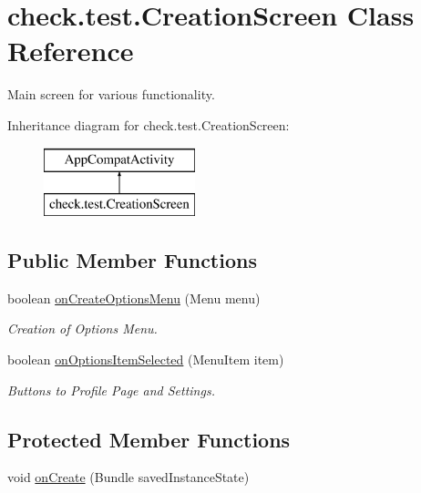 \hypertarget{classcheck_1_1test_1_1_creation_screen}{}\section{check.\+test.\+Creation\+Screen Class Reference}
\label{classcheck_1_1test_1_1_creation_screen}


Main screen for various functionality.  


Inheritance diagram for check.\+test.\+Creation\+Screen\+:\begin{figure}[H]
\begin{center}
\leavevmode
\includegraphics[height=2.000000cm]{classcheck_1_1test_1_1_creation_screen}
\end{center}
\end{figure}
\subsection*{Public Member Functions}
\begin{DoxyCompactItemize}
\item 
\hypertarget{classcheck_1_1test_1_1_creation_screen_aba9d6c11115c94e7b69ccbda460b5805}{}boolean \hyperlink{classcheck_1_1test_1_1_creation_screen_aba9d6c11115c94e7b69ccbda460b5805}{on\+Create\+Options\+Menu} (Menu menu)\label{classcheck_1_1test_1_1_creation_screen_aba9d6c11115c94e7b69ccbda460b5805}

\begin{DoxyCompactList}\small\item\em Creation of Options Menu. \end{DoxyCompactList}\item 
boolean \hyperlink{classcheck_1_1test_1_1_creation_screen_ade63dee597494e9400cda11a80e81ac5}{on\+Options\+Item\+Selected} (Menu\+Item item)
\begin{DoxyCompactList}\small\item\em Buttons to Profile Page and Settings. \end{DoxyCompactList}\end{DoxyCompactItemize}
\subsection*{Protected Member Functions}
\begin{DoxyCompactItemize}
\item 
void \hyperlink{classcheck_1_1test_1_1_creation_screen_aac8b291d450be625a519564e4f4ae7b9}{on\+Create} (Bundle saved\+Instance\+State)
\end{DoxyCompactItemize}


